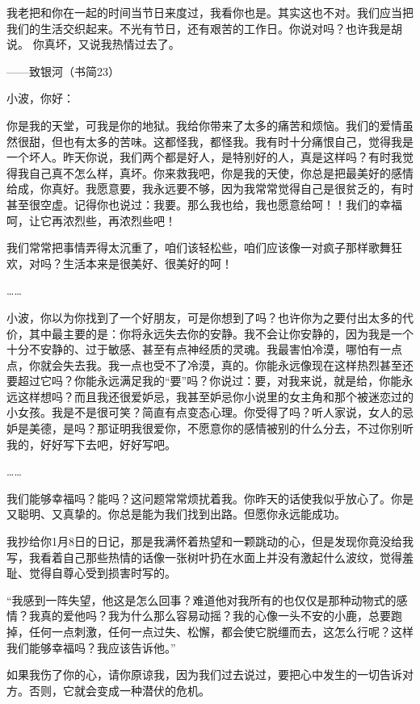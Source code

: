 我老把和你在一起的时间当节日来度过，我看你也是。其实这也不对。我们应当把我们的生活交织起来。不光有节日，还有艰苦的工作日。你说对吗？也许我是胡说。 你真坏，又说我热情过去了。 





——致银河（书简23） 

小波，你好： 

你是我的天堂，可我是你的地狱。我给你带来了太多的痛苦和烦恼。我们的爱情虽然很甜，但也有太多的苦味。这都怪我，都怪我。我有时十分痛恨自己，觉得我是一个坏人。昨天你说，我们两个都是好人，是特别好的人，真是这样吗？有时我觉得我自己真不怎么样，真坏。你来救我吧，你是我的天使，你总是把最美好的感情给成，你真好。我愿意要，我永远要不够，因为我常常觉得自己是很贫乏的，有时甚至很空虚。记得你也说过：我要。那么我也给，我也愿意给呵！！我们的幸福呵，让它再浓烈些，再浓烈些吧！ 

我们常常把事情弄得太沉重了，咱们该轻松些，咱们应该像一对疯子那样歌舞狂欢，对吗？生活本来是很美好、很美好的呵！ 

…… 

小波，你以为你找到了一个好朋友，可是你想到了吗？也许你为之要付出太多的代价，其中最主要的是：你将永远失去你的安静。我不会让你安静的，因为我是一个十分不安静的、过于敏感、甚至有点神经质的灵魂。我最害怕冷漠，哪怕有一点点，你就会失去我。我一点也受不了冷漠，真的。你能永远像现在这样热烈甚至还要超过它吗？你能永远满足我的“要”吗？你说过：要，对我来说，就是给，你能永远这样想吗？而且我还很爱妒忌，我甚至妒忌你小说里的女主角和那个被迷恋过的小女孩。我是不是很可笑？简直有点变态心理。你受得了吗？听人家说，女人的忌妒是美德，是吗？那证明我很爱你，不愿意你的感情被别的什么分去，不过你别听我的，好好写下去吧，好好写吧。 

…… 

我们能够幸福吗？能吗？这问题常常烦扰着我。你昨天的话使我似乎放心了。你是又聪明、又真挚的。你总是能为我们找到出路。但愿你永远能成功。 

我抄给你1月8日的日记，那是我满怀着热望和一颗跳动的心，但是发现你竟没给我写，我看着自己那些热情的话像一张树叶扔在水面上并没有激起什么波纹，觉得羞耻、觉得自尊心受到损害时写的。 

“我感到一阵失望，他这是怎么回事？难道他对我所有的也仅仅是那种动物式的感情？我真的爱他吗？我为什么那么容易动摇？我的心像一头不安的小鹿，总要跑掉，任何一点刺激，任何一点过失、松懈，都会使它脱缰而去，这怎么行呢？这样我们能够幸福吗？我应该告诉他。”　 

如果我伤了你的心，请你原谅我，因为我们过去说过，要把心中发生的一切告诉对方。否则，它就会变成一种潜伏的危机。 

